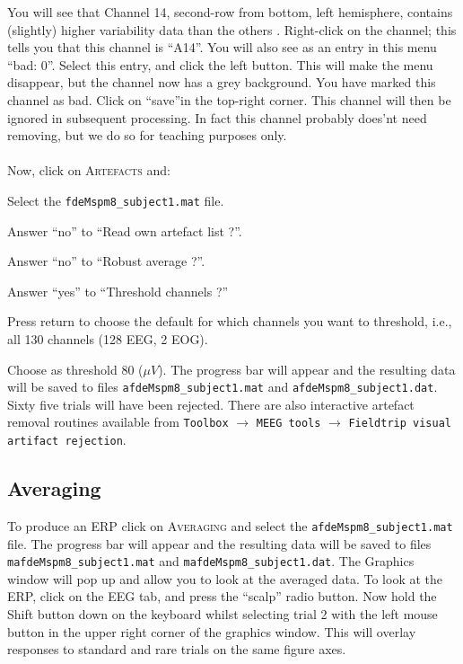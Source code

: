  You will see that Channel 14, second-row from bottom, left hemisphere, contains (slightly) higher variability data than the others .
Right-click on the channel; this tells you that this channel is ``A14''. You will also see as an entry in this menu ``bad: 0''. Select this entry, and click the left button. This will make the menu disappear, but the channel now has a grey background. You have marked this channel as bad. Click on ``save''in the top-right corner. This channel will then be ignored in subsequent processing. In fact this channel probably does'nt need removing, but we do so for teaching purposes only.
\\
\\
Now, click on \textsc{Artefacts} and:
\bi
\item{Select the \texttt{fdeMspm8\_subject1.mat} file.}
\item{Answer ``no'' to ``Read own artefact list ?''.}
\item{Answer ``no'' to ``Robust average ?''.}
\item{Answer ``yes'' to ``Threshold channels ?''}
\item{Press return to choose the default for which channels you want to threshold, i.e., all 130 channels (128 EEG, 2 EOG). }
\item{Choose as threshold 80 ($\mu V$).}
\ei
The progress bar will appear and the resulting data will be saved to files \texttt{afdeMspm8\_subject1.mat} and \texttt{afdeMspm8\_subject1.dat}. Sixty five trials will have been rejected. There are also interactive artefact removal routines available from \texttt{Toolbox} $\rightarrow$ \texttt{MEEG tools} $\rightarrow$  \texttt{Fieldtrip visual artifact rejection}.

\subsection{Averaging}
To produce an ERP click on \textsc{Averaging} and select the \texttt{afdeMspm8\_subject1.mat} file. The progress bar will appear and the resulting data will be saved to files \texttt{mafdeMspm8\_subject1.mat} and \texttt{mafdeMspm8\_subject1.dat}. The Graphics window will pop up and allow you to look at the averaged data. To look at the ERP, click on the EEG tab, and press the ``scalp'' radio button. Now hold  the Shift button down on the keyboard whilst selecting trial 2 with the left mouse button in the upper right corner of the graphics window. This will overlay responses to standard and rare trials on the same figure axes.

